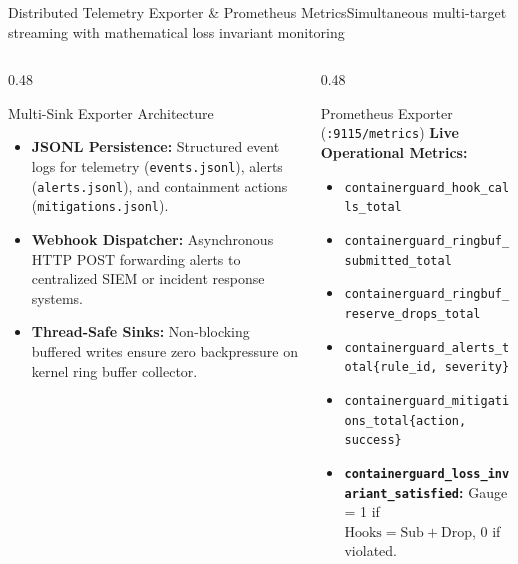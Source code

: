 \documentclass[aspectratio=169,10pt]{beamer}
\begin{document}
\begin{frame}{Distributed Telemetry Exporter \& Prometheus Metrics}{Simultaneous multi-target streaming with mathematical loss invariant monitoring}
  \begin{columns}[T]
    \begin{column}{0.48\textwidth}
      \begin{block}{Multi-Sink Exporter Architecture}
        \scriptsize
        \begin{itemize}
          \item \textbf{JSONL Persistence:} Structured event logs for telemetry (\texttt{events.jsonl}), alerts (\texttt{alerts.jsonl}), and containment actions (\texttt{mitigations.jsonl}).
          \item \textbf{Webhook Dispatcher:} Asynchronous HTTP POST forwarding alerts to centralized SIEM or incident response systems.
          \item \textbf{Thread-Safe Sinks:} Non-blocking buffered writes ensure zero backpressure on kernel ring buffer collector.
        \end{itemize}
      \end{block}
    \end{column}

    \begin{column}{0.48\textwidth}
      \begin{exampleblock}{Prometheus Exporter (\texttt{:9115/metrics})}
        \scriptsize
        \textbf{Live Operational Metrics:}
        \begin{itemize}
          \item \texttt{containerguard\_hook\_calls\_total}
          \item \texttt{containerguard\_ringbuf\_submitted\_total}
          \item \texttt{containerguard\_ringbuf\_reserve\_drops\_total}
          \item \texttt{containerguard\_alerts\_total\{rule\_id, severity\}}
          \item \texttt{containerguard\_mitigations\_total\{action, success\}}
          \item \textbf{\texttt{containerguard\_loss\_invariant\_satisfied}:}
            Gauge = 1 if $\text{Hooks} = \text{Sub} + \text{Drop}$, 0 if violated.
        \end{itemize}
      \end{exampleblock}
    \end{column}
  \end{columns}
\end{frame}
\end{document}
